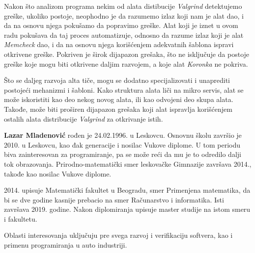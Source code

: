 \documentclass[12pt,oneside]{memoir}
\theoremstyle{plain}
\theoremstyle{definition}
\begin{document}
Nakon što analizom programa nekim od alata distibucije \textit{Valgrind} detektujemo greške, ukoliko postoje, neophodno je da razumemo izlaz koji nam je alat dao, i da na osnovu njega pokušamo da popravimo greške. Alat koji je iznet u ovom radu pokušava da taj proces automatizuje, odnosno da razume izlaz koji je alat \textit{Memcheck} dao, i da na osnovu njega korišćenjem adekvatnih šablona ispravi otkrivene greške. Pokriven je širok dijapazon grešaka, što ne isključuje da postoje greške koje mogu biti otkrivene daljim razvojem, a koje alat \textit{Koronka} ne pokriva. 

Što se daljeg razvoja alta tiče, mogu se dodatno specijalizovati i unaprediti postojeći mehanizmi i šabloni. Kako struktura alata liči na mikro servis, alat se može iskoristiti kao deo nekog novog alata, ili kao odvojeni deo skupa alata. Takođe, može biti proširen dijapazon grešaka koji alat ispravlja korišćenjem ostalih alata distribucije \textit{Valgrind} za otkrivanje istih. 

\literatura

\backmatter

\begin{biografija}
  \textbf{Lazar Mladenović} rođen je 24.02.1996. u Leskovcu. Osnovnu školu završio je 2010. u Leskovcu, kao đak generacije i nosilac Vukove diplome. U tom periodu biva zainteresovan za programiranje, pa se može reći da mu je to odredilo dalji tok obrazovanja. Prirodno-matematički smer leskovačke Gimnazije završava 2014., takođe kao nosilac Vukove diplome.
  
  2014. upisuje Matematički fakultet u Beogradu, smer Primenjena matematika, da bi se  dve godine kasnije prebacio na smer Računarstvo i informatika. Isti završava 2019. godine. Nakon diplomiranja upisuje master studije na istom smeru i fakultetu. 
  
  Oblasti interesovanja uključuju pre svega razvoj i verifikaciju softvera, kao i primenu programiranja u auto industriji.  
    
\end{biografija}
\end{document}
